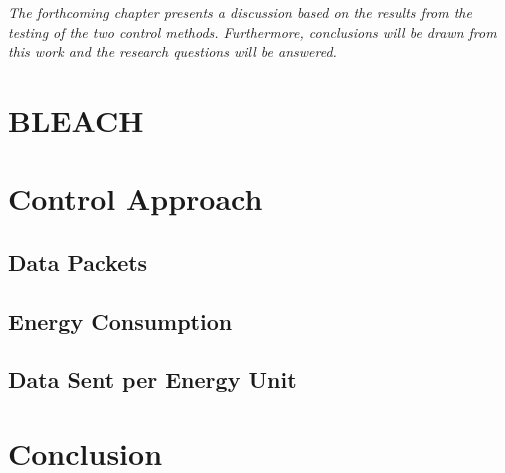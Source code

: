 \textit{The forthcoming chapter presents a discussion based on the results from the testing of the two control methods. Furthermore, conclusions will be drawn from this work and the research questions will be answered.}


\section{BLEACH}

\section{Control Approach}
\subsection{Data Packets}
\subsection{Energy Consumption}
\subsection{Data Sent per Energy Unit}

\section{Conclusion}
